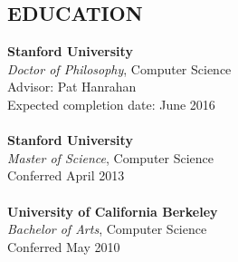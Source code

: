 \documentclass[line,margin]{res}
\begin{document}
\begin{resume}
\section{EDUCATION}
\textbf{Stanford University} \\
\emph{Doctor of Philosophy}, Computer Science \\
Advisor: Pat Hanrahan \\
Expected completion date: June 2016 \\
\\
\textbf{Stanford University} \\
\emph{Master of Science}, Computer Science \\
Conferred April 2013 \\
\\
\textbf{University of California Berkeley} \\
\emph{Bachelor of Arts}, Computer Science \\
Conferred May 2010 \\



\end{resume}
\end{document}
